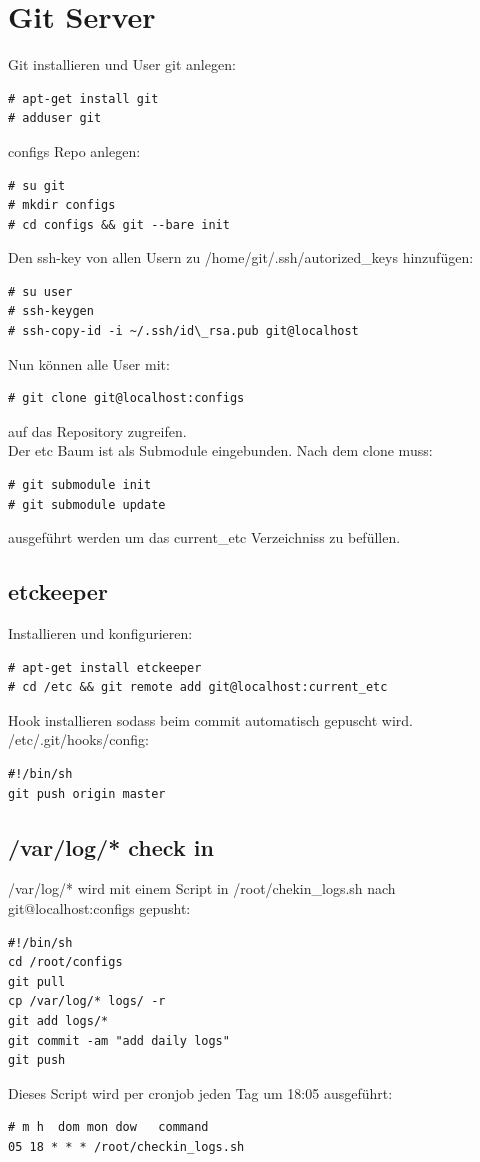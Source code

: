 \section{Git Server}
Git installieren und User git anlegen:
\begin{lstlisting}[style=Bash]
# apt-get install git
# adduser git
\end{lstlisting}
configs Repo anlegen:
\begin{lstlisting}[style=Bash]
# su git
# mkdir configs
# cd configs && git --bare init
\end{lstlisting}
Den ssh-key von allen Usern zu /home/git/.ssh/autorized\_keys hinzufügen:
\begin{lstlisting}[style=Bash]
# su user
# ssh-keygen
# ssh-copy-id -i ~/.ssh/id\_rsa.pub git@localhost
\end{lstlisting}
Nun können alle User mit:
\begin{lstlisting}[style=Bash]
# git clone git@localhost:configs
\end{lstlisting}
auf das Repository zugreifen.\\
Der etc Baum ist als Submodule eingebunden. Nach dem clone muss:
\begin{lstlisting}[style=Bash]
# git submodule init
# git submodule update
\end{lstlisting}
ausgeführt werden um das current\_etc Verzeichniss zu befüllen.
\subsection{etckeeper}
Installieren und konfigurieren:
\begin{lstlisting}[style=Bash]
# apt-get install etckeeper
# cd /etc && git remote add git@localhost:current_etc
\end{lstlisting}
Hook installieren sodass beim commit automatisch gepuscht wird.\\
/etc/.git/hooks/config:
\begin{lstlisting}[style=Bash]
#!/bin/sh
git push origin master
\end{lstlisting}

\subsection{/var/log/* check in}
/var/log/* wird mit einem Script in /root/chekin\_logs.sh nach git@localhost:configs gepusht:
\begin{lstlisting}[style=Bash]
#!/bin/sh
cd /root/configs
git pull
cp /var/log/* logs/ -r
git add logs/*
git commit -am "add daily logs"
git push
\end{lstlisting}
Dieses Script wird per cronjob jeden Tag um 18:05 ausgeführt:
\begin{lstlisting}[style=Bash]
# m h  dom mon dow   command
05 18 * * * /root/checkin_logs.sh
\end{lstlisting}
